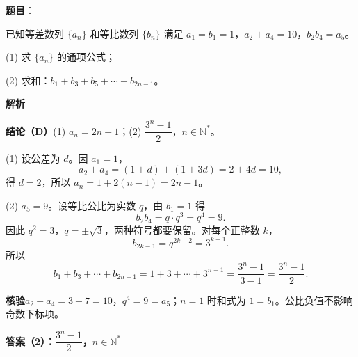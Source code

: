 \begin{answer}

\textbf{题目}：

已知等差数列 $\{a_n\}$ 和等比数列 $\{b_n\}$ 满足 $a_1=b_1=1$，$a_2+a_4=10$，$b_2b_4=a_5$。

(1)   求 $\{a_n\}$ 的通项公式；

(2)   求和：$b_1+b_3+b_5+\cdots+b_{2n-1}$。

\textbf{解析}

\textbf{结论（D）}(1) $a_n=2n-1$；(2) $\dfrac{3^n-1}{2}$，$n\in\mathbb N^*$。

(1) 设公差为 $d$。因 $a_1=1$，
\nopagebreak[4]
\[
a_2+a_4=(1+d)+(1+3d)=2+4d=10,
\]
得 $d=2$，所以 $a_n=1+2(n-1)=2n-1$。

(2) $a_5=9$。设等比公比为实数 $q$，由 $b_1=1$ 得
\nopagebreak[4]
\[
b_2b_4=q\cdot q^3=q^4=9.
\]
因此 $q^2=3$，$q=\pm\sqrt3$，两种符号都要保留。对每个正整数 $k$，
\nopagebreak[4]
\[
b_{2k-1}=q^{2k-2}=3^{k-1}.
\]
所以
\nopagebreak[4]
\[
b_1+b_3+\cdots+b_{2n-1}
=1+3+\cdots+3^{n-1}
=\frac{3^n-1}{3-1}
=\frac{3^n-1}{2}.
\]

\textbf{核验}$a_2+a_4=3+7=10$，$q^4=9=a_5$；$n=1$ 时和式为 $1=b_1$。公比负值不影响奇数下标项。


\textbf{答案（2）：$\dfrac{3^n-1}{2}$，$n\in\mathbb N^*$}

\end{answer}

